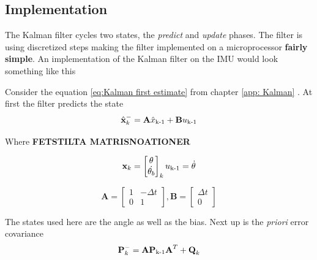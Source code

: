 \documentclass[a4paper,11pt]{kth-mag}
\begin{document}
\subsection{Implementation}
\label{app: Kalman imp}
The Kalman filter cycles two states, the \textit{predict} and \textit{update} phases. The filter is using discretized steps making the filter implemented on a microprocessor \textbf{fairly simple}. 
An implementation of the Kalman filter on the IMU would look something like this

Consider the equation \eqref{eq:Kalman first estimate} from chapter \ref{app: Kalman} . At first the filter predicts the state
\begin{equation}
\hat{\textbf{x}}^-_k = \textbf{A}\hat{x}\textsubscript{k-1}+\textbf{B}u\textsubscript{k-1}
\end{equation}

Where   \textbf{FETSTILTA MATRISNOATIONER}

\begin{equation}
\textbf{x}_k = \begin{bmatrix}
\theta \\
\dot{\theta_b}
\end{bmatrix}_k
u\textsubscript{k-1} = \dot{\theta}
\end{equation}

\begin{equation}
\textbf{A} = \begin{bmatrix}
1  & -\Delta t \\
0   & 1
\end{bmatrix}
,
\textbf{B} = \begin{bmatrix}
\Delta t \\ 0
\end{bmatrix}
\end{equation}

The states used here  are the angle as well as the bias. Next up is the \textit{priori} error covariance
\begin{equation}
\textbf{P}^-_k = \textbf{A} \textbf{P}\textsubscript{k-1}\textbf{A}^T + \textbf{Q}_k
\end{equation}
\end{document}
